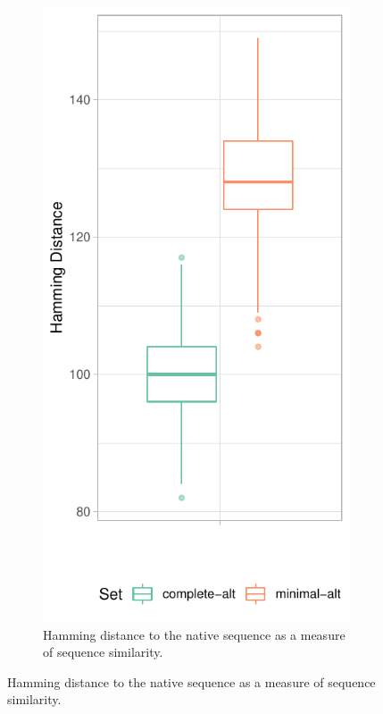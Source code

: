 \documentclass[../../master.tex]{subfiles}
\begin{document}
\begin{figure}[!ht]
\begin{subfigure}[t]{0.2\textwidth}
		\includegraphics[width=\textwidth]{pic/results/designs/boxplots/alt-hamming-boxplot.pdf}
		\caption{Hamming distance to the native sequence as a measure of sequence similarity.
		}\label{fig:stats_alt:a}
	\end{subfigure}%

\end{figure}
\end{document}
